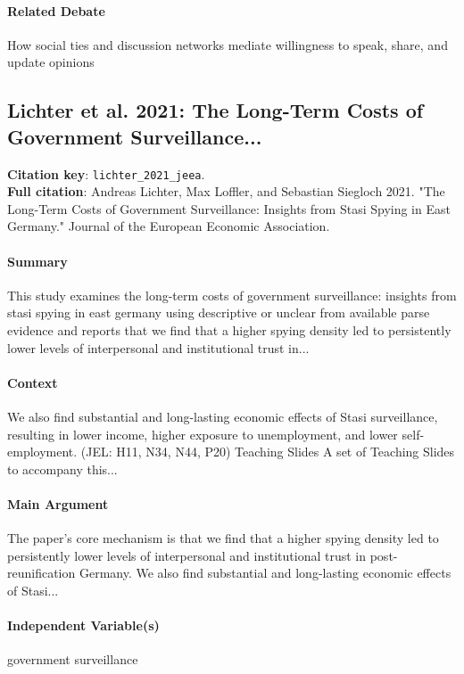 \documentclass[12pt]{article}
\begin{document}
\paragraph{Related Debate} How social ties and discussion networks mediate willingness to speak, share, and update opinions


\subsection{Lichter et al. 2021: The Long-Term Costs of Government Surveillance...}
\textbf{Citation key}: \texttt{lichter\_2021\_jeea}.\\
\textbf{Full citation}: Andreas Lichter, Max Loffler, and Sebastian Siegloch 2021. "The Long-Term Costs of Government Surveillance: Insights from Stasi Spying in East Germany." Journal of the European Economic Association.

\paragraph{Summary} This study examines the long-term costs of government surveillance: insights from stasi spying in east germany using descriptive or unclear from available parse evidence and reports that we find that a higher spying density led to persistently lower levels of interpersonal and institutional trust in...

\paragraph{Context} We also find substantial and long-lasting economic effects of Stasi surveillance, resulting in lower income, higher exposure to unemployment, and lower self-employment. (JEL: H11, N34, N44, P20) Teaching Slides A set of Teaching Slides to accompany this...

\paragraph{Main Argument} The paper's core mechanism is that we find that a higher spying density led to persistently lower levels of interpersonal and institutional trust in post-reunification Germany. We also find substantial and long-lasting economic effects of Stasi...

\paragraph{Independent Variable(s)} government surveillance
\end{document}
